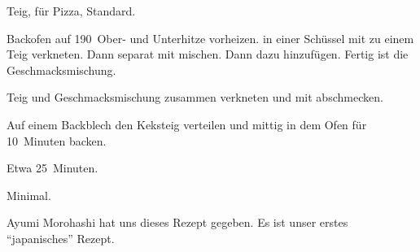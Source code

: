 \begin{recipe}{Teig, für Pizza, Standard.}
	\item[Vorbereitung] Backofen auf 190\textcelsius~Ober- und Unterhitze vorheizen.
	 in einer Schüssel mit
	 zu einem Teig verkneten. Dann separat
	 mit
	 mischen. Dann dazu
	 hinzufügen. Fertig ist die Geschmacksmischung.
	\item[Teig] Teig und Geschmacksmischung zusammen verkneten und mit 
	 abschmecken.
	\item[Backen] Auf einem Backblech den Keksteig verteilen und mittig in dem Ofen für 10~Minuten backen.
	\item[Zubereitungszeit] Etwa 25~Minuten.
	\item[Abwaschaufwand] Minimal.
	\item Ayumi Morohashi hat uns dieses Rezept gegeben. Es ist unser erstes \enquote{japanisches} Rezept.
\end{recipe}
